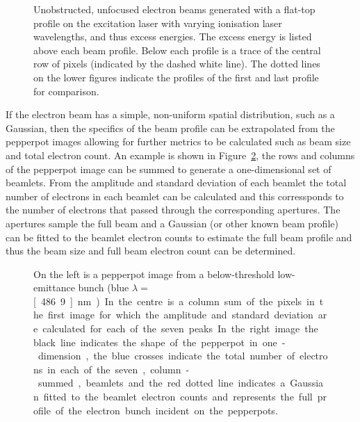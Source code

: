 \begin{figure}
    \center
    
    \caption{Unobstructed, unfocused electron beams generated with a flat-top profile on the excitation laser with varying ionisation laser wavelengths, and thus excess energies. The excess energy is listed above each beam profile. Below each profile is a trace of the central row of pixels (indicated by the dashed white line). The dotted lines on the lower figures indicate the profiles of the first and last profile for comparison.}
    \label{figure:flat_top}
\end{figure}

If the electron beam has a simple, non-uniform spatial distribution, such as a Gaussian, then the specifics of the beam profile can be extrapolated from the pepperpot images allowing for further metrics to be calculated such as beam size and total electron count.
An example is shown in Figure~\ref{figure:pepperpot_profile}, the rows and columns of the pepperpot image can be summed to generate a one-dimensional set of beamlets.
From the amplitude and standard deviation of each beamlet the total number of electrons in each beamlet can be calculated and this corressponds to the number of electrons that passed through the corresponding apertures.
The apertures sample the full beam and a Gaussian (or other known beam profile) can be fitted to the beamlet electron counts to estimate the full beam profile and thus the beam size and full beam electron count can be determined.

\begin{figure}
    \center
    
    \caption{On the left is a pepperpot image from a below-threshold low-emittance bunch (blue $\lambda=$\unit[486.9]{nm}). In the centre is a column sum of the pixels in the first image for which the amplitude and standard deviation are calculated for each of the seven peaks. In the right image the black line indicates the shape of the pepperpot in one-dimension, the blue crosses indicate the total number of electrons in each of the seven, column-summed, beamlets and the red dotted line indicates a Gaussian fitted to the beamlet electron counts and represents the full profile of the electron bunch incident on the pepperpots.}
    \label{figure:pepperpot_profile}
\end{figure}

